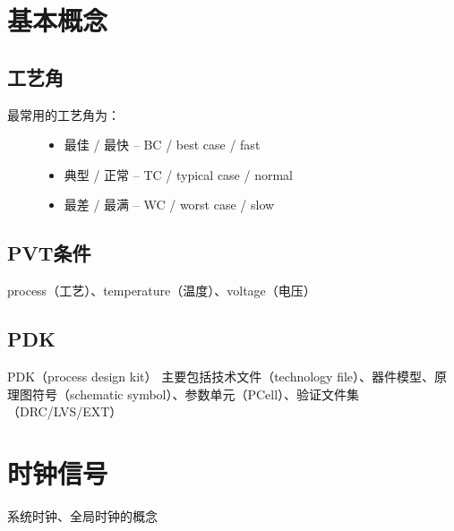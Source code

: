 \documentclass[letterpaper,10pt,english]{sphinxmanual}
\begin{document}
\section{基本概念}
\label{\detokenize{chapter1/_u57fa_u672c_u6982_u5ff5:id1}}\label{\detokenize{chapter1/_u57fa_u672c_u6982_u5ff5::doc}}

\subsection{工艺角}
\label{\detokenize{chapter1/_u57fa_u672c_u6982_u5ff5:id2}}\begin{description}
\item[{最常用的工艺角为：}] \leavevmode\begin{itemize}
\item {} 
\sphinxAtStartPar
最佳 / 最快 – BC / best case / fast

\item {} 
\sphinxAtStartPar
典型 / 正常 – TC / typical case / normal

\item {} 
\sphinxAtStartPar
最差 / 最满 – WC / worst case / slow

\end{itemize}

\end{description}


\subsection{PVT条件}
\label{\detokenize{chapter1/_u57fa_u672c_u6982_u5ff5:pvt}}
\sphinxAtStartPar
process（工艺）、temperature（温度）、voltage（电压）


\subsection{PDK}
\label{\detokenize{chapter1/_u57fa_u672c_u6982_u5ff5:pdk}}
\sphinxAtStartPar
PDK（process design kit） 主要包括技术文件（technology file）、器件模型、原理图符号（schematic symbol）、参数单元（P\sphinxhyphen{}Cell）、验证文件集（DRC/LVS/EXT）


\section{时钟信号}
\label{\detokenize{chapter1/_u65f6_u949f_u4fe1_u53f7:id1}}\label{\detokenize{chapter1/_u65f6_u949f_u4fe1_u53f7::doc}}
\sphinxAtStartPar
系统时钟、全局时钟的概念
\end{document}
